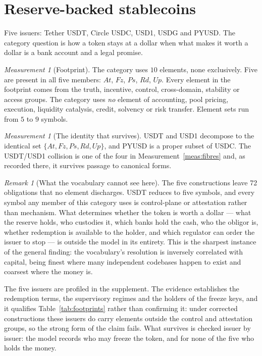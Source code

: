 \documentclass[11pt,reqno]{amsart}
\theoremstyle{plain}
\theoremstyle{definition}
\theoremstyle{remark}
\newtheorem{measurement}[theorem]{Measurement}
\newtheorem{remark}[theorem]{Remark}
\begin{document}
\section{Reserve-backed stablecoins}\label{sec:cat:fiat}

Five issuers: Tether USDT, Circle USDC, USD1, USDG and PYUSD. The category
question is how a token stays at a dollar when what makes it worth a dollar is a
bank account and a legal promise.

\begin{measurement}[Footprint]\label{meas:cat:fiatfoot}
The category uses $10$ elements, none exclusively. Five are present in all five
members: $At$, $Fz$, $Ps$, $Rd$, $Up$. Every element in the footprint comes from
the truth, incentive, control, cross-domain, stability or access groups. The
category uses \emph{no} element of accounting, pool pricing, execution,
liquidity catalysis, credit, solvency or risk transfer. Element sets run from
$5$ to $9$ symbols.
\end{measurement}

\begin{measurement}[The identity that survives]\label{meas:cat:fiatid}
USDT and USD1 decompose to the identical set $\{At,Fz,Ps,Rd,Up\}$, and PYUSD is
a proper subset of USDC. The USDT/USD1 collision is one of the four in
Measurement~\ref{meas:fibres} and, as recorded there, it survives passage to
canonical forms.
\end{measurement}

\begin{remark}[What the vocabulary cannot see here]
The five constructions leave 72 obligations that no element discharges.
USDT reduces to five symbols, and every symbol any member of this category uses
is control-plane or attestation rather than mechanism. What determines whether
the token is worth a dollar --- what the reserve holds, who custodies it, which
banks hold the cash, who the obligor is, whether redemption is available to the
holder, and which regulator can order the issuer to stop --- is outside the
model in its entirety. This is the sharpest instance of the general finding: the
vocabulary's resolution is inversely correlated with capital, being finest where
many independent codebases happen to exist and coarsest where the money is.
\end{remark}

The five issuers are profiled in the supplement. The evidence establishes
the redemption terms, the supervisory regimes and the holders of the freeze
keys, and it qualifies Table~\ref{tab:footprints} rather than confirming it:
under corrected constructions these issuers do carry elements outside the
control and attestation groups, so the strong form of the claim fails. What
survives is checked issuer by issuer: the model records who may freeze the
token, and for none of the five who holds the money.
\end{document}
